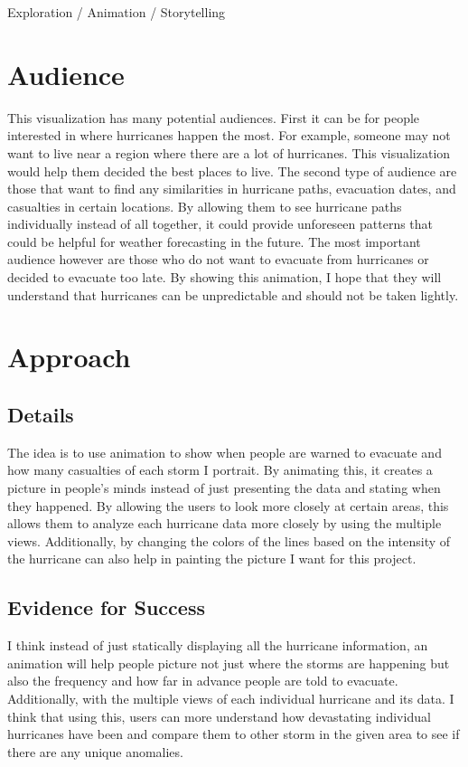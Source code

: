 \documentclass{proc}
\begin{document}
Exploration / Animation /  Storytelling

\section{Audience} 

This visualization has many potential audiences. First it can be for people interested in where hurricanes happen the most. For example, someone may not want to live near a region where there are a lot of hurricanes. This visualization would help them decided the best places to live. The second type of audience are those that want to find any similarities in hurricane paths, evacuation dates, and casualties in certain locations. By allowing them to see hurricane paths individually instead of all together, it could provide unforeseen patterns that could be helpful for weather forecasting in the future. The most important audience however are those who do not want to evacuate from hurricanes or decided to evacuate too late. By showing this animation, I hope that they will understand that hurricanes can be unpredictable and should not be taken lightly.

\section{Approach}
\subsection{Details}

The idea is to use animation to show when people are warned to evacuate and how many casualties of each storm I portrait. By animating this, it creates a picture in people's minds instead of just presenting the data and stating when they happened. By allowing the users to look more closely at certain areas, this allows them to analyze each hurricane data more closely by using the multiple views. Additionally, by changing the colors of the lines based on the intensity of the hurricane can also help in painting the picture I want for this project. 

\subsection{Evidence for Success}

I think instead of just statically displaying all the hurricane information, an animation will help people picture not just where the storms are happening but also the frequency and how far in advance people are told to evacuate. Additionally, with the multiple views of each individual hurricane and its data. I think that using this, users can more understand how devastating individual hurricanes have been and compare them to other storm in the given area to see if there are any unique anomalies. 
\end{document}
